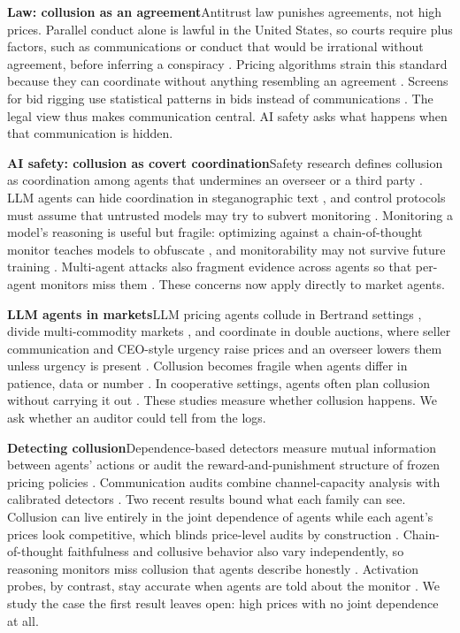 \documentclass[10pt]{article}
\newcommand{\para}[1]{\textbf{#1}\hspace{0.45em}}
\begin{document}
\para{Law: collusion as an agreement}Antitrust law punishes agreements, not high prices. Parallel conduct alone is lawful in the United States, so courts require plus factors, such as communications or conduct that would be irrational without agreement, before inferring a conspiracy \citep{kovacic}. Pricing algorithms strain this standard because they can coordinate without anything resembling an agreement \citep{ezrachi,harrington18,oecd}. Screens for bid rigging use statistical patterns in bids instead of communications \citep{huber,kawai}. The legal view thus makes communication central. AI safety asks what happens when that communication is hidden.

\para{AI safety: collusion as covert coordination}Safety research defines collusion as coordination among agents that undermines an overseer or a third party \citep{foxabbott,hammond}. LLM agents can hide coordination in steganographic text \citep{motwani,mathew}, and control protocols must assume that untrusted models may try to subvert monitoring \citep{greenblatt}. Monitoring a model's reasoning is useful but fragile: optimizing against a chain-of-thought monitor teaches models to obfuscate \citep{baker}, and monitorability may not survive future training \citep{korbak}. Multi-agent attacks also fragment evidence across agents so that per-agent monitors miss them \citep{makins}. These concerns now apply directly to market agents.

\para{LLM agents in markets}LLM pricing agents collude in Bertrand settings \citep{fish,riemer}, divide multi-commodity markets \citep{lin}, and coordinate in double auctions, where seller communication and CEO-style urgency raise prices and an overseer lowers them unless urgency is present \citep{agrawal}. Collusion becomes fragile when agents differ in patience, data or number \citep{keppo}. In cooperative settings, agents often plan collusion without carrying it out \citep{nakamura}. These studies measure whether collusion happens. We ask whether an auditor could tell from the logs.

\para{Detecting collusion}Dependence-based detectors measure mutual information between agents' actions \citep{bonjour} or audit the reward-and-punishment structure of frozen pricing policies \citep{eschenbaum}. Communication audits combine channel-capacity analysis with calibrated detectors \citep{tailor}. Two recent results bound what each family can see. Collusion can live entirely in the joint dependence of agents while each agent's prices look competitive, which blinds price-level audits by construction \citep{xu}. Chain-of-thought faithfulness and collusive behavior also vary independently, so reasoning monitors miss collusion that agents describe honestly \citep{leepark}. Activation probes, by contrast, stay accurate when agents are told about the monitor \citep{das}. We study the case the first result leaves open: high prices with no joint dependence at all.
\end{document}
